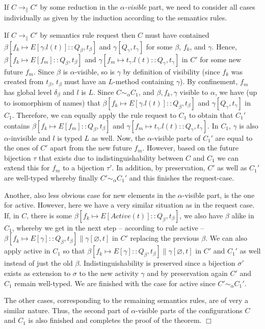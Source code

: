 \documentclass[10pt, conference, compsocconf]{IEEEtran}
\newcommand\inda{\sim_{\alpha}}
\newcommand\dist{\ensuremath{\to_\|}}
\begin{document}
If $C \dist C'$ by some reduction in the {\it $\alpha$-visible} part, we need to consider all cases
individually as given by the induction according to the semantics rules. 

If $C \dist C'$ by semantics rule {\sc request} then  $C$ must have contained
$\beta[f_k \mapsto E[\gamma.l(t)] :: Q_\beta, t_\beta]$ and $\gamma[Q_\gamma,t_\gamma]$ for some
$\beta$, $f_k$, and $\gamma$. Hence, $\beta[f_k \mapsto E[f_m] :: Q_\beta, t_\beta]$ and
$\gamma[f_m \mapsto t_\gamma.l(t):: Q_\gamma, t_\gamma]$ in $C'$ for some new future $f_m$.
Since $\beta$ is $\alpha$-visible, so is $\gamma$ by definition of visibility
(since $f_k$ was created from $t_\beta$, $t_\beta$ must have an $L$-method containing
$\gamma$). By confinement, $f_m$ has global level $\delta_\beta$ and $l$ is $L$.
Since $C \inda C_1$, and $\beta, f_k, \gamma$ visible to $\alpha$, we 
have (up to isomorphism of names) that $\beta[f_k \mapsto E[\gamma.l(t)] :: Q_\beta, t_\beta]$ and $\gamma[Q_\gamma,t_\gamma]$ 
in $C_1$. Therefore, we can equally apply the rule {\sc request} to $C_1$ to obtain
that $C_1'$ contains $\beta[f_k \mapsto E[f_m] :: Q_\beta, t_\beta]$ and 
$\gamma[f_m \mapsto t_\gamma.l(t):: Q_\gamma, t_\gamma]$. In $C_1$, $\gamma$
is also $\alpha$-invisible and $l$ is typed $L$ as well.
Now, the $\alpha$-visible parts of $C_1'$ are equal to the ones of $C'$ apart from the new
future $f_m$. However, based on the future bijection $\tau$ that exists due to indistinguishability
between $C$ and $C_1$ we can extend this for $f_m$ to a bijection $\tau'$. In addition, by preservation,
$C'$ as well as $C_1'$ are well-typed whereby finally $C' \inda C_1'$ and this finishes the {\sc request}-case.


Another, also less obvious case for new elements in the $\alpha$-visible part, is the one for {\sc active}. 
However, here we have a very similar situation as in the {\sc request} case. If, in $C$, there is some 
$\beta[f_k \mapsto E[Active(t)] :: Q_\beta, t_\beta]$, we also have $\beta$ alike in $C_1$,
whereby we get in the next step -- according to rule {\sc active} -- $\beta[f_k \mapsto E[\gamma] :: Q_\beta, t_\beta]
\parallel \gamma[\varnothing, t]$ in $C'$ replacing 
the previous $\beta$. We can also apply {\sc active} in $C_1$ so 
that $\beta[f_k \mapsto E[\gamma] :: Q_\beta, t_\beta]
\parallel \gamma[\varnothing, t]$ in $C'$ and $C_1'$ as well instead of just the old $\beta$.
Indistinguishability is preserved since a bijection $\sigma'$ exists as extension to $\sigma$ to
the new activity $\gamma$ and by preservation again $C'$ and $C_1$ remain well-typed.
We are finished with the case for {\sc active} since $C' \inda C_1'$.

The other cases, corresponding to the remaining semantics rules, are of very a similar nature. 
Thus, the second part of $\alpha$-visible parts of the configurations $C$ and $C_1$ is also finished and completes
the proof of the theorem.
\hfill {$\Box$}
\end{document}
